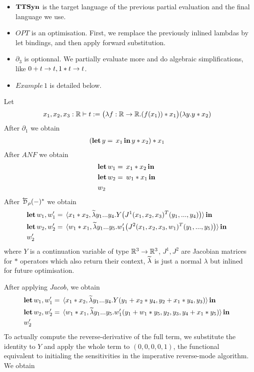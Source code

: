 \begin{itemize}
	\item $\mathbf{TTSyn}$ is the target language of the previous partial evaluation and the final language we use.
	\item $OPT$ is an optimisation. First, we remplace the previously inlined lambdas by let bindings, and then apply forward substitution.
	\item $\partial_3$  is optionnal. We partially evaluate more and do algebraic simplifications, like $0+\trm\to\trm, 1*\trm\to \trm$.
	\item $Example\,1$ is detailed below.
\end{itemize}


\begin{example}
	Let 
\begin{align*}
	\var_1,\var_2,\var_3:\RR\vdash \trm:=\big(\lambda f:\RR\to\RR. (f(\var_1))*\var_1\big)(\lambda \var[2]. \var[2]* \var_2)
\end{align*}
After $\partial_1$ we obtain 
\begin{align*}
	(\letin{\var[2]}{\var_1}{\var[2]*\var_2})*\var_1
\end{align*}
After $ANF$ we obtain
\begin{align*}
	&\letin{w_1}{\var_1 * \var_2}{\\&\letin{w_2}{w_1 * \var_1}{\\&w_2}}
\end{align*}
After $\Dsynrev[\rho]{-}^*$ we obtain
	\begin{align*}
		&\letin{w_1,w_1'}{\tPair{\var_1 * \var_2}{\inllambda \var[2]_1...\var[2]_4.Y\big(J^1(\var_1,\var_2,\var_3)^T(\var[2]_1,...,\var[2]_4)\big)} }{
		\\
		&\letin{w_2,w_2'}{\tPair{w_1 * \var_1}{\inllambda \var[2]_1...\var[2]_5.w_1'\big(J^2(\var_1,\var_2,\var_3,w_1)^T(\var[2]_1,...,\var[2]_5)\big)}}{\\ 
		& w_2'}}
	\end{align*}
where $Y$ is a continuation variable of type $\mathbb{R}^3\to\mathbb{R}^3$, $J^1,J^2$ are Jacobian matrices for $*$ operators which also return their context, $\widetilde{\lambda}$ is just a normal $\lambda$ but inlined for future optimisation.

After applying $Jacob$, we obtain
	\begin{align*}
		&\letin{w_1,w_1'}{\tPair{\var_1 * \var_2}{\inllambda \var[2]_1...\var[2]_4.Y(\var[2]_1+\var_2*\var[2]_4,\var[2]_2+\var_1*\var[2]_4,\var[2]_3)} }{
		\\
		&\letin{w_2,w_2'}{\tPair{w_1 * \var_1}{\inllambda \var[2]_1...\var[2]_5.w_1'(\var[2]_1+w_1 * \var[2]_5,\var[2]_2,\var[2]_3,\var[2]_4+ \var_1 * \var[2]_5)}}{\\ 
		& w_2'}}
	\end{align*}
To actually compute the reverse-derivative of the full term, we substitute the identity to $Y$ and apply the whole term to $(0,0,0,0,1)$, the functional equivalent to initialing the sensitivities in the imperative reverse-mode algorithm. We obtain


\end{example}
